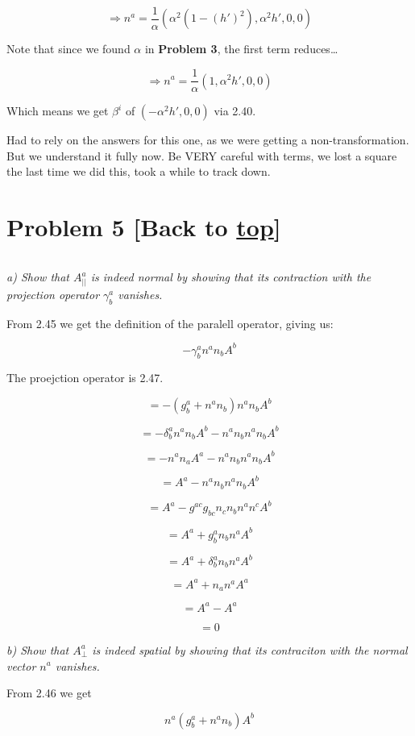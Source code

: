 \documentclass[landscape,letterpaper,10pt,english]{article}
\begin{document}
\[ \Rightarrow n^a = \frac1\alpha(\alpha^2(1-(h')^2), \alpha^2h',0,0) \]

Note that since we found \(\alpha\) in \textbf{Problem 3}, the first
term reduces\ldots{}

\[ \Rightarrow n^a = \frac1\alpha(1, \alpha^2h',0,0) \]

Which means we get \(\beta^i\) of \((-\alpha^2 h',0,0)\) via 2.40.

Had to rely on the answers for this one, as we were getting a
non-transformation. But we understand it fully now. Be VERY careful with
terms, we lost a square the last time we did this, took a while to track
down.

    \hypertarget{problem-5-back-to-top}{%
\section{\texorpdfstring{Problem 5 {[}Back to
\hyperref[toc]{top}{]}}{Problem 5 {[}Back to {]}}}\label{problem-5-back-to-top}}

\[\label{P5}\]

\emph{a) Show that \(A^a_{||}\) is indeed normal by showing that its
contraction with the projection operator \(\gamma^a_b\) vanishes.}

    From 2.45 we get the definition of the paralell operator, giving us:

\[ - \gamma^a_b n^a n_b A^b \]

The proejction operator is 2.47.

\[ = - (g^a_b + n^an_b) n^a n_b A^b \]

\[ = -\delta^a_bn^a n_b A^b -n^an_b n^a n_b A^b \]

    \[ = - n^a n_a A^a - n^an_b n^a n_b A^b \]

\[ = A^a - n^an_b n^a n_b A^b \]

\[ = A^a - g^{ac}g_{bc}n_cn_b n^a n^c A^b \]

\[ = A^a + g^a_bn_b n^a A^b \]

\[ = A^a + \delta^a_bn_b n^a A^b \]

\[ = A^a + n_a n^a A^a \]

\[ = A^a - A^a \]

\[ = 0 \]

    \emph{b) Show that \(A^a_\perp\) is indeed spatial by showing that its
contraciton with the normal vector \(n^a\) vanishes.}

From 2.46 we get

\[ n^a(g^a_b + n^an_b)A^b \]
\end{document}
